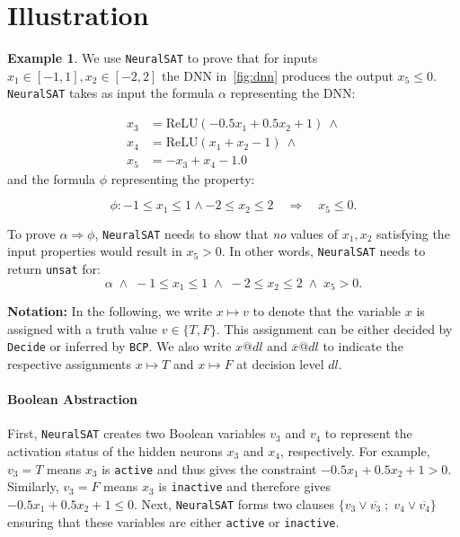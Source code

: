 \documentclass[oneside,11pt,dvipsnames]{book}
\numberwithin{equation}{section}
\theoremstyle{definition}
\newtheorem{example}{Example}[section]
\theoremstyle{remark}
\newcommand{\neuralsat}{\texttt{NeuralSAT}}
\newcommand{\relu}[1]{\mathrm{ReLU}\left(#1\right)}
\begin{document}
\section{Illustration}
\begin{example}\label{ex:neuralsat}
We use \neuralsat{} to prove that for inputs $x_1 \in [-1, 1], x_2 \in [-2,2]$ the DNN in~\autoref{fig:dnn} produces the output $x_5 \le 0$.
\neuralsat{} takes as input the formula $\alpha$ representing the DNN:

\begin{equation*}%
\begin{aligned}
  x_3 &=  \relu{-0.5x_1 + 0.5x_2 + 1} ~\land\\
  x_4 &= \relu{x_1 + x_2 - 1} ~\land\\
  x_5 &= -x_3 + x_4 - 1.0
\end{aligned}
\end{equation*}
and the formula $\phi$ representing the property:

\begin{equation*}\label{eq:valid_prop}
    \phi : -1\le x_1 \le 1 \land -2 \le x_2 \le 2 \quad\Rightarrow\quad x_5 \le 0.
\end{equation*}

To prove $\alpha \Rightarrow \phi$, \neuralsat{} needs to show  that \emph{no} values of $x_1,x_2$ satisfying the input properties would result in $x_5 > 0$. In other words, \neuralsat{} needs to return \texttt{unsat} for: 
\begin{equation}\label{eq:negprop}
  \alpha\; \land\; -1 \le x_1 \le 1     \;\land\; -2 \le x_2 \le 2   \;\land\; x_5 > 0.
\end{equation} 

\textbf{Notation:} In the following, we write $x \mapsto v$ to denote that the variable $x$ is assigned with a truth value $v \in \{T,F\}$. This assignment can be either decided by \texttt{Decide} or inferred by \texttt{BCP}. We also write $x@dl$ and  $\overline{x}@dl$ to indicate the respective assignments $x \mapsto T$ and $x \mapsto F$  at decision level $dl$.

\paragraph{Boolean Abstraction} First, \neuralsat{} creates two Boolean variables $v_3$ and $v_4$ to represent the
activation status of the hidden neurons $x_3$ and $x_4$, respectively. For example, $v_3=T$ means $x_3$ is \texttt{active} and thus gives the constraint $-0.5x_1 + 0.5x_2 + 1 > 0$. Similarly, $v_3=F$ means $x_3$ is \texttt{inactive} and therefore gives $-0.5x_1 + 0.5x_2 + 1\le 0$. Next, \neuralsat{} forms two clauses  $\{v_3 \lor \overline{v_3} \;;\; v_4 \lor \overline{v_4}\}$ ensuring that these variables are either \texttt{active} or \texttt{inactive}.



\end{example}
\end{document}

